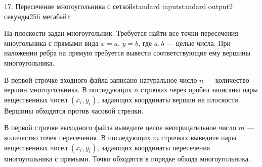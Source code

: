\begin{problem}{17. Пересечение многоугольника с сеткой}{standard input}{standard output}{2 секунды}{256 мегабайт}

На плоскости задан многоугольник. Требуется найти все точки пересечения мноугольника с прямыми вида $x = a$, $y = b$, где $a, b$ --- целые числа. При наложении ребра на прямую требуется вывести соответствующие ему вершины многоугольника.

\InputFile

В первой строчке входного файла записано натуральное число $n$ --- количество вершин многоугольника. В последующих $n$ строчках через пробел записаны пары вещественных чисел $(x_i, y_i)$, задающих координаты вершин на плоскости. Вершины обходятся против часовой стрелки.

\OutputFile

В первой строчке выходного файла выведите целое неотрицательное число $m$ --- количество точек пересечения. В последующих $m$ строчках выведите пары вещественных чисел $(x_i, y_i)$, задающих координаты пересечения многоугольника с прямыми. Точки обходятся в порядке обхода многоугольника.

\Examples

\begin{example}%
%
%
\end{example}

\end{problem}
